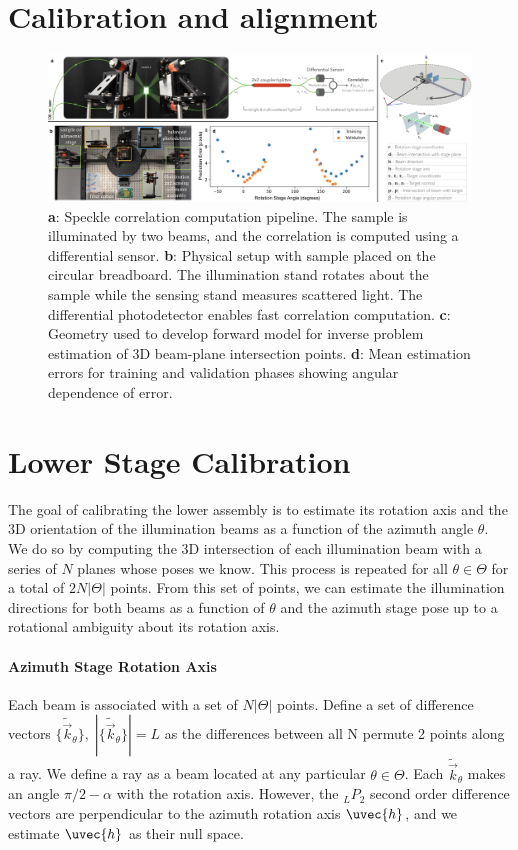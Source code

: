 
\section{Calibration and alignment}
\begin{figure}
    \centering
    \includegraphics[width=\textwidth]{figures/experiment.png}
    \caption{\textbf{a}: Speckle correlation computation pipeline. The sample is illuminated by two beams, and the correlation is computed using a differential sensor. \textbf{b}: Physical setup with sample placed on the circular breadboard. The illumination stand rotates about the sample while the sensing stand measures scattered light. The differential photodetector enables fast correlation computation. \textbf{c}: Geometry used to develop forward model for inverse problem estimation of 3D beam-plane intersection points. \textbf{d}: Mean estimation errors for training and validation phases showing angular dependence of error.}
    \label{fig:3}
\end{figure}

\section{Lower Stage Calibration} \label{sec:lower_stage_calibration}
The goal of calibrating the lower assembly is to estimate its rotation axis and the 3D orientation of the illumination beams as a function of the azimuth angle $\theta$. We do so by computing the 3D intersection of each illumination beam with a series of $N$ planes whose poses we know. This process is repeated for all $\theta \in \Theta$ for a total of $2N|\Theta|$ points. From this set of points, we can estimate the illumination directions for both beams as a function of $\theta$ and the azimuth stage pose up to a rotational ambiguity about its rotation axis.

\paragraph{Azimuth Stage Rotation Axis}
Each beam is associated with a set of $N|\Theta|$ points. Define a set of difference vectors $\{\tilde{\vec{k}}_\theta\}, \; |\{\tilde{\vec{k}}_\theta\}| = L$ as the differences between all N permute 2 points along a ray. We define a ray as a beam located at any particular $\theta \in \Theta$. Each $\tilde{\vec{k}}_\theta$ makes an angle $\pi/2 - \alpha$ with the rotation axis. However, the $_L P_2$ second order difference vectors are perpendicular to the azimuth rotation axis $\uvec{h}$, and we estimate $\uvec{h}$ as their null space.

